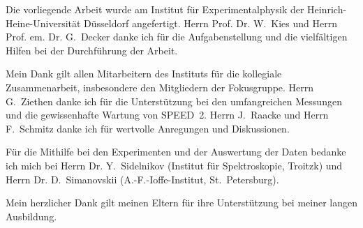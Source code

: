 %
%
\label{sec:dank}
%
Die vorliegende Arbeit wurde am Institut für Experimentalphysik der
Heinrich-Heine-Universität Düsseldorf angefertigt. Herrn Prof. Dr.
W.~Kies und Herrn Prof. em. Dr. G.~Decker danke ich für die
Aufgabenstellung und die vielfältigen Hilfen bei der Durchführung der
Arbeit.
\par
Mein Dank gilt allen Mitarbeitern des Instituts für die kollegiale
Zusammenarbeit, insbesondere den Mitgliedern der Fokusgruppe. Herrn
G.~Ziethen danke ich für die Unterstützung bei den umfangreichen
Messungen und die gewissenhafte Wartung von SPEED~2. Herrn J.~Raacke
und Herrn F.~Schmitz danke ich für wertvolle Anregungen und
Diskussionen.
\par
Für die Mithilfe bei den Experimenten und der Auswertung der Daten
bedanke ich mich bei Herrn Dr. Y.~Sidelnikov (Institut für
Spektroskopie, Troitzk) und Herrn Dr. D.~Simanovskii
(A.-F.-Ioffe-Institut, St.~Petersburg).
\par
Mein herzlicher Dank gilt meinen Eltern für ihre Unterstützung bei
meiner langen Ausbildung.
